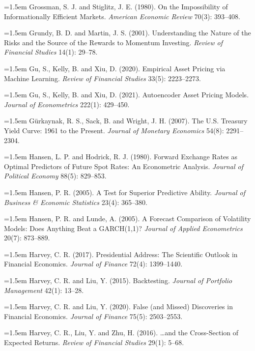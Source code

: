 \hangindent=1.5em Grossman, S. J. and Stiglitz, J. E. (1980). On the Impossibility of Informationally Efficient Markets. \emph{American Economic Review} 70(3): 393--408.

\hangindent=1.5em Grundy, B. D. and Martin, J. S. (2001). Understanding the Nature of the Risks and the Source of the Rewards to Momentum Investing. \emph{Review of Financial Studies} 14(1): 29--78.

\hangindent=1.5em Gu, S., Kelly, B. and Xiu, D. (2020). Empirical Asset Pricing via Machine Learning. \emph{Review of Financial Studies} 33(5): 2223--2273.

\hangindent=1.5em Gu, S., Kelly, B. and Xiu, D. (2021). Autoencoder Asset Pricing Models. \emph{Journal of Econometrics} 222(1): 429--450.

\hangindent=1.5em G\"urkaynak, R. S., Sack, B. and Wright, J. H. (2007). The U.S. Treasury Yield Curve: 1961 to the Present. \emph{Journal of Monetary Economics} 54(8): 2291--2304.

\hangindent=1.5em Hansen, L. P. and Hodrick, R. J. (1980). Forward Exchange Rates as Optimal Predictors of Future Spot Rates: An Econometric Analysis. \emph{Journal of Political Economy} 88(5): 829--853.

\hangindent=1.5em Hansen, P. R. (2005). A Test for Superior Predictive Ability. \emph{Journal of Business \& Economic Statistics} 23(4): 365--380.

\hangindent=1.5em Hansen, P. R. and Lunde, A. (2005). A Forecast Comparison of Volatility Models: Does Anything Beat a GARCH(1,1)? \emph{Journal of Applied Econometrics} 20(7): 873--889.

\hangindent=1.5em Harvey, C. R. (2017). Presidential Address: The Scientific Outlook in Financial Economics. \emph{Journal of Finance} 72(4): 1399--1440.

\hangindent=1.5em Harvey, C. R. and Liu, Y. (2015). Backtesting. \emph{Journal of Portfolio Management} 42(1): 13--28.

\hangindent=1.5em Harvey, C. R. and Liu, Y. (2020). False (and Missed) Discoveries in Financial Economics. \emph{Journal of Finance} 75(5): 2503--2553.

\hangindent=1.5em Harvey, C. R., Liu, Y. and Zhu, H. (2016). \ldots and the Cross-Section of Expected Returns. \emph{Review of Financial Studies} 29(1): 5--68.

